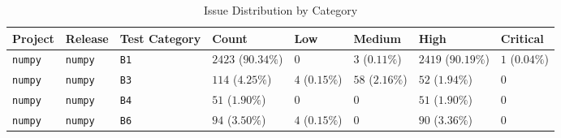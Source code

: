 \begin{table}
\caption{Issue Distribution by Category}
\label{tab:issue-category-distribution}
\begin{tabular}{llllllll}
\toprule
Project & Release & Test Category & Count & Low & Medium & High & Critical \\
\midrule
\texttt{numpy} & \texttt{numpy} & \texttt{B1} & $2423$ ($90.34\%$) & $0$ & $3$ ($0.11\%$) & $2419$ ($90.19\%$) & $1$ ($0.04\%$) \\
\texttt{numpy} & \texttt{numpy} & \texttt{B3} & $114$ ($4.25\%$) & $4$ ($0.15\%$) & $58$ ($2.16\%$) & $52$ ($1.94\%$) & $0$ \\
\texttt{numpy} & \texttt{numpy} & \texttt{B4} & $51$ ($1.90\%$) & $0$ & $0$ & $51$ ($1.90\%$) & $0$ \\
\texttt{numpy} & \texttt{numpy} & \texttt{B6} & $94$ ($3.50\%$) & $4$ ($0.15\%$) & $0$ & $90$ ($3.36\%$) & $0$ \\
\bottomrule
\end{tabular}
\end{table}
